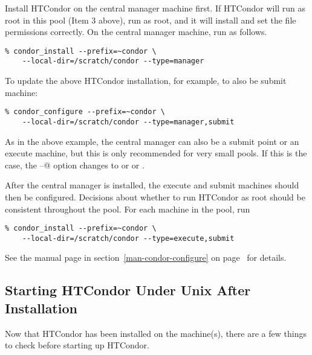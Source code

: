 Install HTCondor on the central manager machine first.  If HTCondor
will run as root in this pool (Item 3 above), run  
as root, and it will install and set the file permissions correctly.  
On the central manager machine, run  as follows.
\begin{verbatim}
% condor_install --prefix=~condor \
	--local-dir=/scratch/condor --type=manager
\end{verbatim}

To update the above HTCondor installation, for example, to also be
submit machine:
\begin{verbatim}
% condor_configure --prefix=~condor \
	--local-dir=/scratch/condor --type=manager,submit
\end{verbatim}

As in the above example, the central manager can also be a submit
point or an execute machine, but this is only recommended for very
small pools.  If this is the case, the 
\verb@--@
option changes to
 or   or 
.

After the central manager is installed, the execute and submit machines
should then be configured.  Decisions about whether to run HTCondor as root
should be consistent throughout the pool. For each machine in the pool,
run

\begin{verbatim}
% condor_install --prefix=~condor \
	--local-dir=/scratch/condor --type=execute,submit
\end{verbatim}

See the  manual page in
section~\ref{man-condor-configure} on
page~\pageref{man-condor-configure} for details.


\subsection{\label{installed-now-what}
Starting HTCondor Under Unix After Installation}

Now that HTCondor has been installed on the machine(s), there are a few
things to check before starting up HTCondor.

